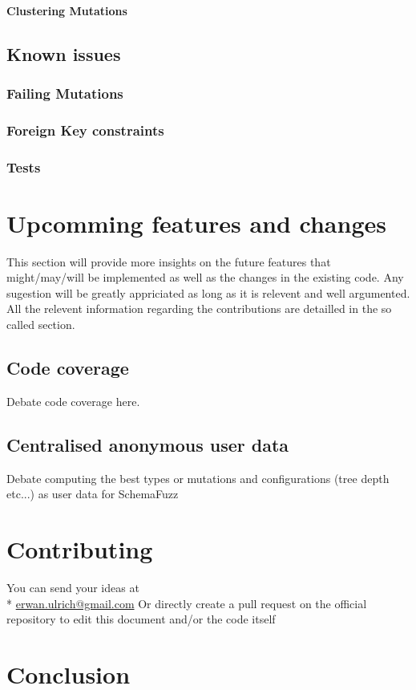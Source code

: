 \documentclass{article}
\begin{document}
				\paragraph{Clustering Mutations}
		\subsection{Known issues}		
			\subsubsection{Failing Mutations}
			\subsubsection{Foreign Key constraints}
			\subsubsection{Tests}
	\section{Upcomming features and changes}
This section will provide more insights on the future features that might/may/will be implemented as well as the changes in the existing code.
Any sugestion will be greatly appriciated as long as it is relevent and well argumented. All the relevent information regarding the contributions are detailled in the so called section.
	
		\subsection{Code coverage}
Debate code coverage here.
		\subsection{Centralised anonymous user data}
Debate computing the best types or mutations and configurations (tree depth etc...) as user data for SchemaFuzz
		
	\section{Contributing}
You can send your ideas at  \\*
		\url{erwan.ulrich@gmail.com}
Or directly create a pull request on the official repository to edit this document and/or the code itself
	\section{Conclusion}
\end{document}
